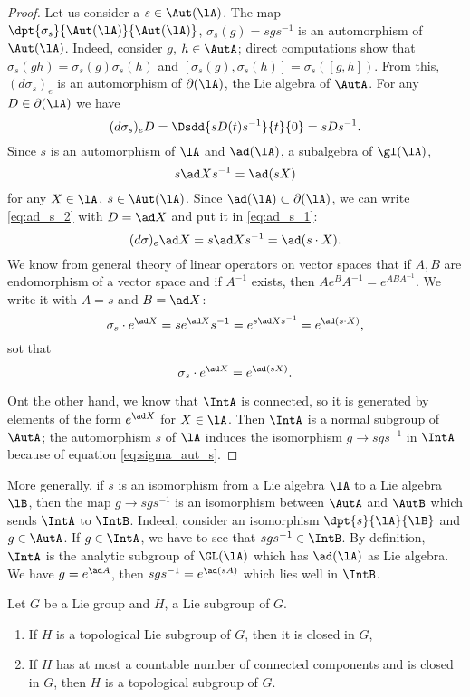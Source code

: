 \begin{proof}
	Let us consider a $s\in\Aut(\lA)$. The map $\dpt{\sigma_s}{\Aut(\lA)}{\Aut(\lA)}$, $\sigma_s(g)=sgs^{-1}$ is an automorphism of $\Aut(\lA)$. Indeed, consider $g$, $h\in\AutA$; direct computations show that $\sigma_s(gh)=\sigma_s(g)\sigma_s(h)$ and $[\sigma_s(g),\sigma_s(h)]=\sigma_s([g,h])$. From this, $(d\sigma_s)_e$ is an automorphism of $\partial(\lA)$, the Lie algebra of $\AutA$. For any $D\in\partial(\lA)$ we have
	\begin{equation}\label{eq:ad_s_2}
		(d\sigma_s)_eD=\Dsdd{ sD(t)s^{-1} }{t}{0}
		=sDs^{-1}.
	\end{equation}
	Since $s$ is an automorphism of $\lA$ and $\ad(\lA)$, a subalgebra of $\gl(\lA)$,
	\begin{equation}\label{eq:ad_s_1}
		s\ad Xs^{-1}=\ad(sX)
	\end{equation}
	for any $X\in\lA$, $s\in\Aut(\lA)$. Since $\ad(\lA)\subset\partial(\lA)$, we can write \eqref{eq:ad_s_2} with $D=\ad X$ and put it in \eqref{eq:ad_s_1}:
	\[
		(d\sigma)_e\ad X=s\ad Xs^{-1}=\ad(s\cdot X).
	\]
	We know from general theory of linear operators on vector spaces that if $A,B$ are endomorphism of a vector space and if $A^{-1}$ exists, then $Ae^BA^{-1}=e^{ABA^{-1}}$. We write it with $A=s$ and $B=\ad X$:
	\[
		\sigma_s\cdot e^{\ad X}=se^{\ad X}s^{-1}=e^{s\ad Xs^{-1}}=e^{\ad(s\cdot X)},
	\]
	sot that
	\begin{equation}\label{eq:sigma_aut_s}
		\sigma_s\cdot e^{\ad X}=e^{\ad(s X)}.
	\end{equation}

	Ont the other hand, we know that $\IntA$ is connected, so it is generated by elements of the form $e^{\ad X}$ for $X\in\lA$. Then $\IntA$ is a normal subgroup of $\AutA$; the automorphism $s$ of $\lA$ induces the isomorphism $g\to sgs^{-1}$ in $\IntA$ because of equation \eqref{eq:sigma_aut_s}.
\end{proof}

More generally, if $s$ is an isomorphism from a Lie algebra $\lA$ to a Lie algebra $\lB$, then the map $g\to sgs^{-1}$ is an isomorphism between $\AutA$ and $\AutB$ which sends $\IntA$ to $\IntB$. Indeed, consider an isomorphism $\dpt{s}{\lA}{\lB}$ and $g\in\AutA$. If $g\in\IntA$, we have to see that $sgs^{-1}\in\IntB$. By definition, $\IntA$ is the analytic subgroup of $\GL(\lA)$ which has $\ad(\lA)$ as Lie algebra. We have $g=e^{\ad A}$, then $sgs^{-1}=e^{\ad(sA)}$ which lies well in $\IntB$.

\begin{theorem}
	Let $G$ be a Lie group and $H$, a Lie subgroup of $G$.
	\begin{enumerate}
		\item If $H$ is a topological Lie subgroup of $G$, then it is closed in $G$,
		\item If $H$ has at most a countable number of connected components and is closed in $G$, then $H$ is a topological subgroup of $G$.
	\end{enumerate}
	\label{tho:H_ferme}
\end{theorem}

